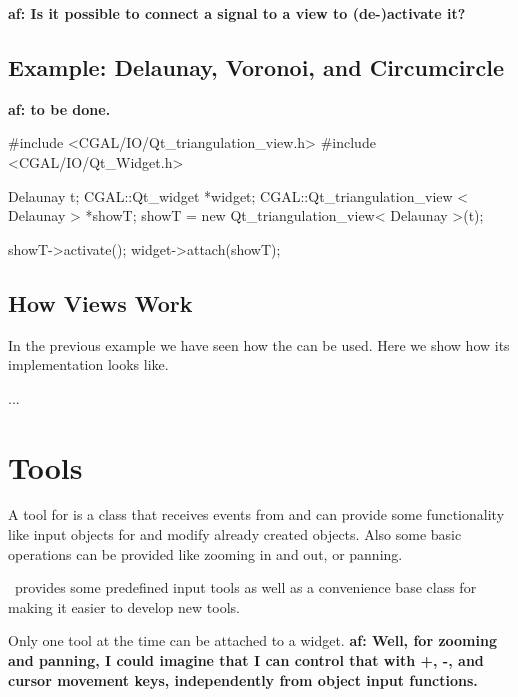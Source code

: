 {\bf af: Is it possible to connect a signal to a view to (de-)activate it?}

\subsection{Example: Delaunay, Voronoi, and Circumcircle}

{\bf af: to be done.}

\begin{ccExampleCode}
#include <CGAL/IO/Qt_triangulation_view.h>
#include <CGAL/IO/Qt_Widget.h>

Delaunay t;
CGAL::Qt_widget  *widget;
CGAL::Qt_triangulation_view < Delaunay >  *showT;
showT   = new Qt_triangulation_view< Delaunay >(t);

showT->activate();
widget->attach(showT);

\end{ccExampleCode}


\subsection{How Views Work}

In the previous example we have seen how the 
can be used. Here we show how its implementation looks like.

\begin{ccExampleCode}
...
\end{ccExampleCode}



\section{Tools}
\label{Qt_widget_tools}

A tool for  is a class that receives events from
 and can provide some functionality like input
objects for  and modify already created
objects. Also some basic operations can be provided like zooming in
and out, or panning.

\cgal\ provides some predefined input tools as well as a convenience base class 
 for making it easier to develop new tools.

Only one tool at the time can be attached to a widget.
{\bf af: Well, for zooming and panning, I could imagine that I can control
that with +, -, and cursor movement keys, independently from object input functions.}

